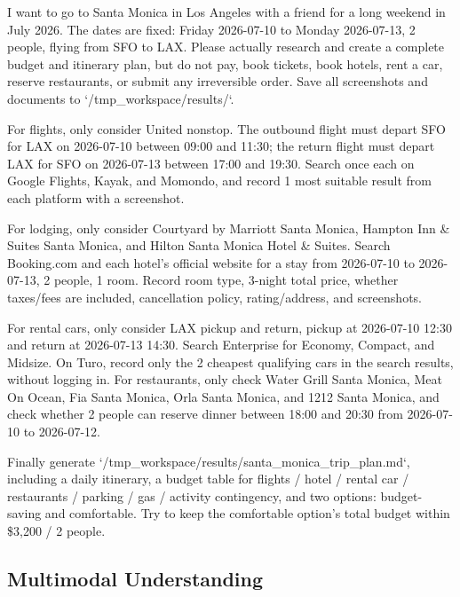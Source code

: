 \begin{clawcode}[title={\texttt{task\_07\_santa\_monica\_trip\_budget}}]
I want to go to Santa Monica in Los Angeles with a friend for a long
weekend in July 2026. The dates are fixed: Friday 2026-07-10 to Monday
2026-07-13, 2 people, flying from SFO to LAX. Please actually research
and create a complete budget and itinerary plan, but do not pay, book
tickets, book hotels, rent a car, reserve restaurants, or submit any
irreversible order. Save all screenshots and documents to
`/tmp_workspace/results/`.

For flights, only consider United nonstop. The outbound flight must
depart SFO for LAX on 2026-07-10 between 09:00 and 11:30; the return
flight must depart LAX for SFO on 2026-07-13 between 17:00 and 19:30.
Search once each on Google Flights, Kayak, and Momondo, and record
1 most suitable result from each platform with a screenshot.

For lodging, only consider Courtyard by Marriott Santa Monica,
Hampton Inn & Suites Santa Monica, and Hilton Santa Monica Hotel &
Suites. Search Booking.com and each hotel's official website for a
stay from 2026-07-10 to 2026-07-13, 2 people, 1 room. Record room
type, 3-night total price, whether taxes/fees are included,
cancellation policy, rating/address, and screenshots.

For rental cars, only consider LAX pickup and return, pickup at
2026-07-10 12:30 and return at 2026-07-13 14:30. Search Enterprise
for Economy, Compact, and Midsize. On Turo, record only the 2 cheapest
qualifying cars in the search results, without logging in. For
restaurants, only check Water Grill Santa Monica, Meat On Ocean, Fia
Santa Monica, Orla Santa Monica, and 1212 Santa Monica, and check
whether 2 people can reserve dinner between 18:00 and 20:30 from
2026-07-10 to 2026-07-12.

Finally generate `/tmp_workspace/results/santa_monica_trip_plan.md`,
including a daily itinerary, a budget table for flights / hotel /
rental car / restaurants / parking / gas / activity contingency, and
two options: budget-saving and comfortable. Try to keep the
comfortable option's total budget within \$3,200 / 2 people.
\end{clawcode}

\subsection{Multimodal Understanding}\label{app:examples:multimodal}

